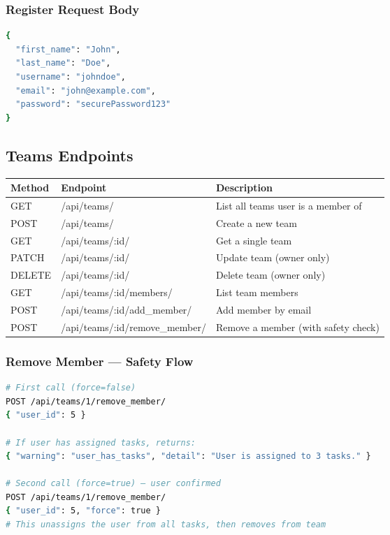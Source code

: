 \documentclass[12pt,a4paper]{article}
\begin{document}
\subsubsection{Register Request Body}
\begin{lstlisting}[language=bash]
{
  "first_name": "John",
  "last_name": "Doe",
  "username": "johndoe",
  "email": "john@example.com",
  "password": "securePassword123"
}
\end{lstlisting}

\subsection{Teams Endpoints}
\begin{center}
\begin{tabularx}{\textwidth}{llX}
\toprule
\textbf{Method} & \textbf{Endpoint} & \textbf{Description} \\
\midrule
GET & /api/teams/ & List all teams user is a member of \\
POST & /api/teams/ & Create a new team \\
GET & /api/teams/:id/ & Get a single team \\
PATCH & /api/teams/:id/ & Update team (owner only) \\
DELETE & /api/teams/:id/ & Delete team (owner only) \\
GET & /api/teams/:id/members/ & List team members \\
POST & /api/teams/:id/add\_member/ & Add member by email \\
POST & /api/teams/:id/remove\_member/ & Remove a member (with safety check) \\
\bottomrule
\end{tabularx}
\end{center}

\subsubsection{Remove Member — Safety Flow}
\begin{lstlisting}[language=bash]
# First call (force=false)
POST /api/teams/1/remove_member/
{ "user_id": 5 }

# If user has assigned tasks, returns:
{ "warning": "user_has_tasks", "detail": "User is assigned to 3 tasks." }

# Second call (force=true) — user confirmed
POST /api/teams/1/remove_member/
{ "user_id": 5, "force": true }
# This unassigns the user from all tasks, then removes from team
\end{lstlisting}
\end{document}
